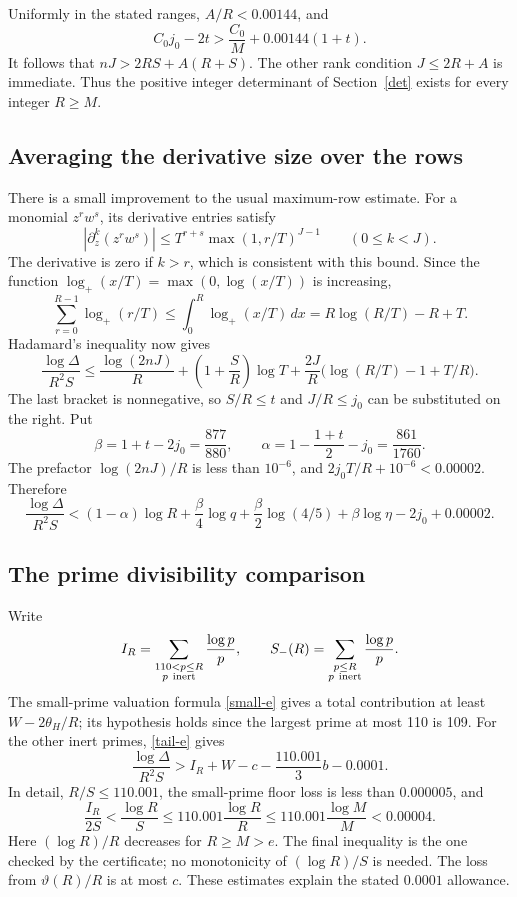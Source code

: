\documentclass[11pt]{article}
\begin{document}
Uniformly in the stated ranges, \(A/R<0.00144\), and
\[
 C_0j_0-2t>
 \frac{C_0}{M}+0.00144(1+t).
\]
It follows that \(nJ>2RS+A(R+S)\).
The other rank condition \(J\le2R+A\) is immediate.
Thus the positive integer determinant of Section~\ref{det} exists
for every integer \(R\ge M\).

\subsection{Averaging the derivative size over the rows}

There is a small improvement to the usual maximum-row estimate.
For a monomial \(z^rw^s\), its derivative entries satisfy
\[
 |\partial_z^k(z^rw^s)|\le
 T^{r+s}\max(1,r/T)^{J-1}\qquad(0\le k<J).
\]
The derivative is zero if \(k>r\), which is consistent with this bound.
Since the function \(\log_+(x/T)=\max(0,\log(x/T))\) is increasing,
\[
 \sum_{r=0}^{R-1}\log_+(r/T)
 \le\int_0^R\log_+(x/T)\,dx=R\log(R/T)-R+T.
\]
Hadamard's inequality now gives
\begin{equation}\label{mean-arch}
 \frac{\log\Delta}{R^2S}
 \le \frac{\log(2nJ)}R+
 \left(1+\frac SR\right)\log T+
 \frac{2J}R\bigl(\log(R/T)-1+T/R\bigr).
\end{equation}
The last bracket is nonnegative, so \(S/R\le t\) and \(J/R\le j_0\)
can be substituted on the right. Put
\[
 \beta=1+t-2j_0=\frac{877}{880},\qquad
 \alpha=1-\frac{1+t}{2}-j_0=\frac{861}{1760}.
\]
The prefactor \(\log(2nJ)/R\) is less than \(10^{-6}\), and
\(2j_0T/R+10^{-6}<0.00002\). Therefore
\begin{equation}\label{new-arch}
 \frac{\log\Delta}{R^2S}
 <(1-\alpha)\log R+\frac{\beta}{4}\log q+
 \frac{\beta}{2}\log(4/5)+\beta\log\eta-2j_0+0.00002.
\end{equation}

\subsection{The prime divisibility comparison}

Write
\[
 I_R=\sum_{\substack{110<p\le R\\p\ {\rm inert}}}\frac{\log p}{p},
 \qquad
 S_-(R)=\sum_{\substack{p\le R\\p\ {\rm inert}}}\frac{\log p}{p}.
\]
The small-prime valuation formula \eqref{small-e} gives a total
contribution at least \(W-2\theta_H/R\); its hypothesis holds since
the largest prime at most 110 is 109.
For the other inert primes, \eqref{tail-e} gives
\[
 \frac{\log\Delta}{R^2S}>
 I_R+W-c-\frac{110.001}{3}b-0.0001.
\]
In detail, \(R/S\le110.001\), the small-prime floor loss is less than
\(0.000005\), and
\[
 \frac{I_R}{2S}<\frac{\log R}{S}
 \le110.001\frac{\log R}{R}
 \le110.001\frac{\log M}{M}<0.00004.
\]
Here \((\log R)/R\) decreases for \(R\ge M>e\).
The final inequality is the one checked by the certificate; no
monotonicity of \((\log R)/S\) is needed.
The loss from \(\vartheta(R)/R\) is at most \(c\).
These estimates explain the stated \(0.0001\) allowance.
\end{document}
